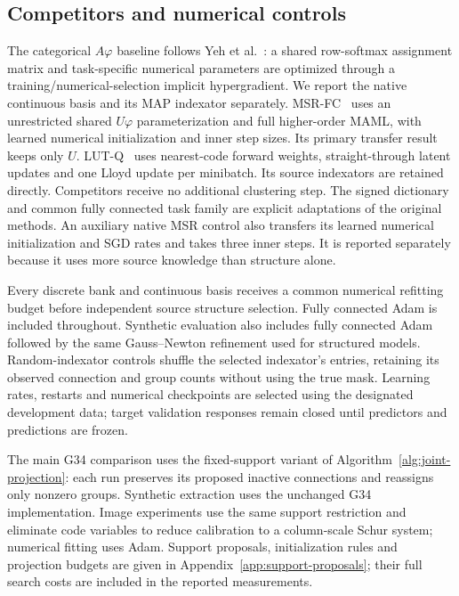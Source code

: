 \subsection{Competitors and numerical controls}

The categorical $A\varphi$ baseline follows Yeh
et al.~\cite{yeh2022equivariance}: a shared row-softmax assignment matrix
and task-specific numerical parameters are optimized through a
training/numerical-selection implicit hypergradient. We report the
native continuous basis and its MAP indexator separately.
MSR-FC~\cite{zhou2021meta} uses an unrestricted shared $U\varphi$
parameterization and full higher-order MAML, with learned numerical
initialization and inner step sizes. Its primary transfer result keeps
only $U$. LUT-Q~\cite{cardinaux2018iteratively} uses nearest-code forward
weights, straight-through latent updates and one Lloyd update per
minibatch. Its source indexators are retained directly. Competitors
receive no additional clustering step. The signed dictionary and
common fully connected task family are explicit adaptations of the
original methods.
An auxiliary native MSR control also transfers its learned numerical
initialization and SGD rates and takes three inner steps. It is reported
separately because it uses more source knowledge than structure alone.

Every discrete bank and continuous basis receives a common numerical
refitting budget before independent source structure selection.
Fully connected Adam is included throughout. Synthetic evaluation also
includes fully connected Adam followed by the same Gauss--Newton
refinement used for structured models. Random-indexator controls
shuffle the selected indexator's entries, retaining its observed
connection and group counts without using the true mask.
Learning rates, restarts and numerical checkpoints are selected using
the designated development data; target validation responses remain closed
until predictors and predictions are frozen.

The main G34 comparison uses the fixed-support variant of
Algorithm~\ref{alg:joint-projection}: each run preserves its proposed
inactive connections and reassigns only nonzero groups. Synthetic extraction
uses the unchanged G34 implementation. Image experiments use the same
support restriction and eliminate code variables to reduce calibration
to a column-scale Schur system; numerical fitting uses Adam.
Support proposals, initialization rules and projection budgets are
given in Appendix~\ref{app:support-proposals}; their full search costs
are included in the reported measurements.


